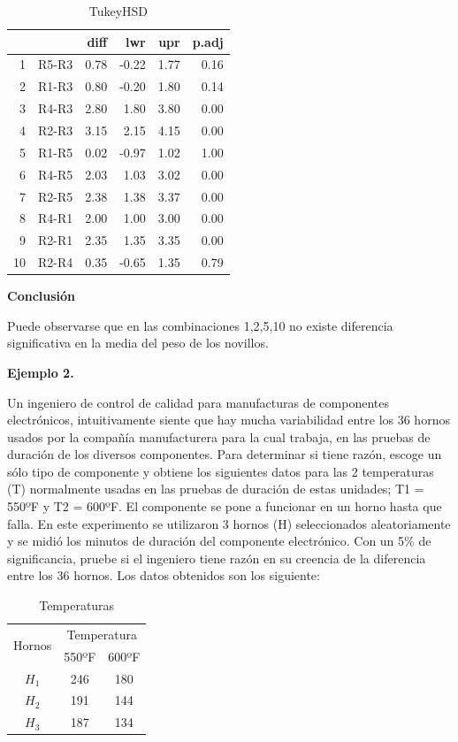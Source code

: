 \documentclass[12pt,letterpaper]{report}
\begin{document}
\begin{table}[ht]
\centering
\begin{tabular}{rrrrrr}
  \hline
      & & diff & lwr & upr & p.adj \\ 
  \hline
1&R5-R3 & 0.78 & -0.22 & 1.77 & 0.16 \\ 
2&R1-R3 & 0.80 & -0.20 & 1.80 & 0.14 \\ 
3&R4-R3 & 2.80 & 1.80 & 3.80 & 0.00 \\ 
4&R2-R3 & 3.15 & 2.15 & 4.15 & 0.00 \\ 
5&R1-R5 & 0.02 & -0.97 & 1.02 & 1.00 \\ 
6&R4-R5 & 2.03 & 1.03 & 3.02 & 0.00 \\ 
7&R2-R5 & 2.38 & 1.38 & 3.37 & 0.00 \\ 
8&R4-R1 & 2.00 & 1.00 & 3.00 & 0.00 \\ 
9&R2-R1 & 2.35 & 1.35 & 3.35 & 0.00 \\ 
10&R2-R4 & 0.35 & -0.65 & 1.35 & 0.79 \\ 
   \hline
\end{tabular}
\caption{TukeyHSD}
\end{table}
\newpage
\textbf{Conclusión}

Puede observarse que en las combinaciones 1,2,5,10 no existe diferencia significativa en la media del peso de los novillos.

\newpage

\textbf{Ejemplo 2.}

Un ingeniero de control de calidad para manufacturas de componentes electrónicos,
intuitivamente siente que hay mucha variabilidad entre los 36 hornos usados por la compañía
manufacturera para la cual trabaja, en las pruebas de duración de los diversos componentes.
Para determinar si tiene razón, escoge un sólo tipo de componente y obtiene los siguientes
datos para las 2 temperaturas (T) normalmente usadas en las pruebas de duración de estas
unidades; T1 = 550ºF y T2 = 600ºF. El componente se pone a funcionar en un horno hasta que
falla. En este experimento se utilizaron 3 hornos (H) seleccionados aleatoriamente y se midió
los minutos de duración del componente electrónico. Con un 5\% de significancia, pruebe si el
ingeniero tiene razón en su creencia de la diferencia entre los 36 hornos. Los datos obtenidos
son los siguiente:

\begin{table}[htb]
\centering
\begin{tabular}{||c|c|c||}
\hline
\hline
\multirow{2}{*}{Hornos}  & \multicolumn{2}{|c||}{Temperatura} \\
\cline{2-3}
         &550ºF&600ºF \\
\hline
$H_1$       &246&180 \\
\hline
$H_2$       &191&144 \\
\hline
$H_3$       &187&134 \\
\hline
\hline

\end{tabular}
\caption{Temperaturas}
\end{table}
\end{document}
